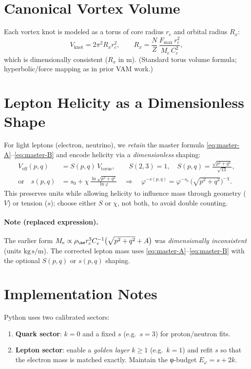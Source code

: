 \documentclass[12pt]{article}
\begin{document}
  \section{Canonical Vortex Volume}
  Each vortex knot is modeled as a torus of core radius \(r_c\) and orbital radius \(R_x\):
  \begin{equation}
      V_{\text{knot}}=2\pi^2 R_x r_c^2,\qquad
      R_x=\frac{N}{Z}\,\frac{F_{\max}\,r_c^2}{M_e\,C_e^2},
  \end{equation}
  which is dimensionally consistent (\(R_x\) in m). (Standard torus volume formula; hyperbolic/force mapping as in prior VAM work.)

  \section{Lepton Helicity as a Dimensionless Shape}
  For light leptons (electron, neutrino), we \emph{retain} the master formula \eqref{eq:master-A}–\eqref{eq:master-B} and encode helicity via a \emph{dimensionless} shaping:
  \begin{align}
      V_{\text{eff}}(p,q) &= S(p,q)\,V_{\text{torus}},
      \qquad S(2,3)=1,\quad
      S(p,q)=\frac{\sqrt{p^2+q^2}}{\sqrt{13}}, \\
      \text{or}\quad
      s(p,q) &= s_0 + \chi\,\frac{\ln\!\sqrt{p^2+q^2}}{\ln\varphi}
      \quad\Longrightarrow\quad
      \varphi^{-s(p,q)}=\varphi^{-s_0}\,\big(\sqrt{p^2+q^2}\big)^{-\chi}.
  \end{align}
  This preserves units while allowing helicity to influence mass through geometry (\(V\)) or tension (\(s\)); choose either \(S\) or \(\chi\), not both, to avoid double counting.

  \paragraph{Note (replaced expression).}
  The earlier form
  \(
  M_e \propto \rho_{\ae} r_c^3 C_e^{-1}\big(\sqrt{p^2+q^2}+A\big)
  \)
  was \emph{dimensionally inconsistent} (units \(\mathrm{kg\,s/m}\)). The corrected lepton mass uses \eqref{eq:master-A}–\eqref{eq:master-B} with the optional \(S(p,q)\) or \(s(p,q)\) shaping.

  \section{Implementation Notes}
  Python uses two calibrated sectors:
  \begin{enumerate}
      \item \textbf{Quark sector}: \(k=0\) and a fixed \(s\) (e.g.\ \(s=3\)) for proton/neutron fits.
      \item \textbf{Lepton sector}: enable a \emph{golden layer} \(k\ge1\) (e.g.\ \(k=1\)) and refit \(s\) so that the electron mass is matched exactly. Maintain the φ-budget \(E_\varphi=s+2k\).
  \end{enumerate}
\end{document}
